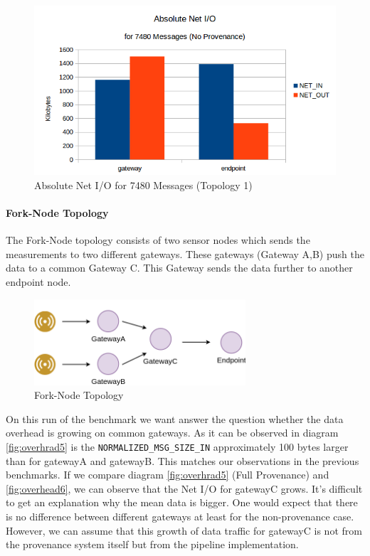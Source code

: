 \begin{figure}[H]
	\center
	\includegraphics[width=\textwidth]{figures/overheaddiagram8.png}
	\caption{Absolute Net I/O for 7480 Messages (Topology 1)}
	\label{fig:topo1absolutewithouotprov}
\end{figure}



\paragraph*{Fork-Node Topology}
The Fork-Node topology consists of two sensor nodes which sends the measurements to two different gateways. These gateways (Gateway A,B) push the data to a common Gateway C. This Gateway sends the data further to another endpoint node.

\begin{figure}[H]
	\center
	\includegraphics[width=0.7\textwidth]{figures/dataoverheadtopolabeled2.png}
	\caption{Fork-Node Topology}
	\label{fig:deployment}
\end{figure}


On this run of the benchmark we want answer the question whether the data overhead is growing on common gateways. As it can be observed in diagram \ref{fig:overhrad5} is the \texttt{NORMALIZED\_MSG\_SIZE\_IN} approximately 100 bytes larger than for gatewayA and gatewayB. This matches our observations in the previous benchmarks.
If we compare diagram \ref{fig:overhrad5} (Full Provenance) and  \ref{fig:overhead6}, we can observe that the Net I/O for gatewayC grows. It's difficult to get an explanation why the mean data is bigger. One would expect that there is no difference between different gateways at least for the non-provenance case.
However, we can assume that this growth of data traffic for gatewayC is not from the provenance system itself but from the pipeline implementation.


